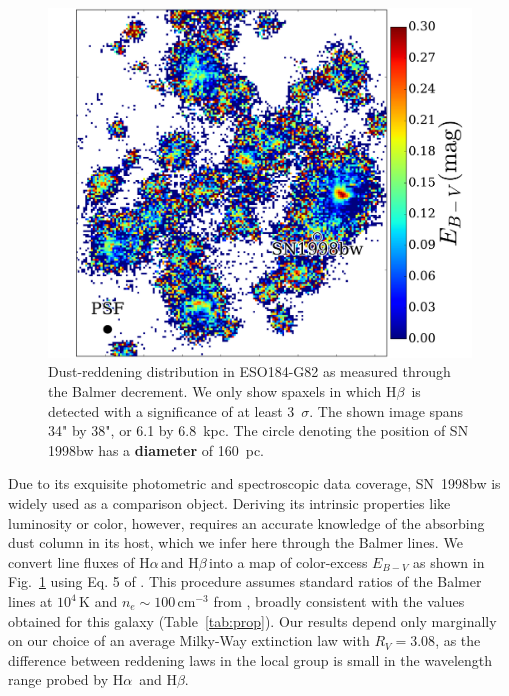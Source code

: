 \documentclass[traditabstract, referee]{aa}
\newcommand{\hb}{H$\beta$}
\newcommand{\ha}{H$\alpha$}
\begin{document}
\begin{figure}
\includegraphics[angle=0, width=0.99\columnwidth]{Figs/MUSE_SN1998bw_EB-V.pdf}
\caption{Dust-reddening distribution in ESO184-G82 as measured through the Balmer decrement. We only show spaxels in which \hb\, is detected with a significance of at least 3~$\sigma$. The shown image spans 34" by 38", or 6.1 by 6.8~kpc. The circle denoting the position of SN\,1998bw has a \textbf{diameter} of 160~pc.}
\label{fig:ebv}
\end{figure}

Due to its exquisite photometric and spectroscopic data coverage, SN~1998bw is widely used as a comparison object. Deriving its intrinsic properties like luminosity or color, however, requires an accurate knowledge of the absorbing dust column in its host, which we infer here through the Balmer lines. We convert line fluxes of \ha\,and \hb\,into a map of color-excess $E_{B-V}$ as shown in Fig.~\ref{fig:ebv} using Eq. 5 of \citet{2015A&A...581A.125K}. This procedure assumes standard ratios of the Balmer lines at $10^4$\,K and $n_e\sim100\,\mathrm{cm}^{-3}$ from \citet{1989agna.book.....O}, broadly consistent with the values obtained for this galaxy (Table~\ref{tab:prop}). Our results depend only marginally on our choice of an average Milky-Way extinction law \citep{1992ApJ...395..130P} with $R_V=3.08$, as the difference between reddening laws in the local group is small in the wavelength range probed by \ha\, and \hb. 
\end{document}
